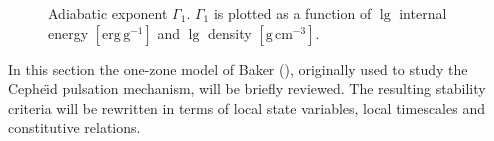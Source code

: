 \documentclass{aa}
\begin{document}
   \begin{figure}
   \centering
   \caption{Adiabatic exponent $\Gamma_1$.
               $\Gamma_1$ is plotted as a function of
               $\lg$ internal energy $\mathrm{[erg\,g^{-1}]}$ and $\lg$
               density $\mathrm{[g\,cm^{-3}]}$.}
              \label{FigGam}%
    \end{figure}
%
   In this section the one-zone model of Baker (\cite{baker}),
   originally used to study the Cephe{\"{\i}}d pulsation mechanism, will
   be briefly reviewed. The resulting stability criteria will be
   rewritten in terms of local state variables, local timescales and
   constitutive relations.
\end{document}
